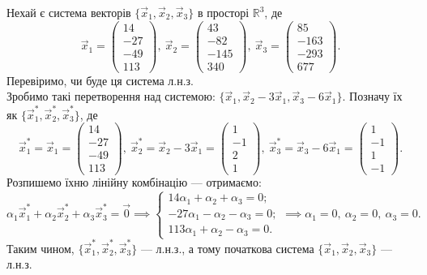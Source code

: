 \documentclass{math_library}
\begin{document}
	\begin{example}
	Нехай є система векторів $\{\vec{x}_1,\vec{x}_2,\vec{x}_3\}$ в просторі $\mathbb{R}^3$, де
	\[ 
	\vec{x}_1 = \begin{pmatrix}
	14 \\ -27 \\ -49 \\ 113
	\end{pmatrix},\ \vec{x}_2 = \begin{pmatrix}
	43 \\ -82 \\ -145 \\ 340
	\end{pmatrix},\ \vec{x}_3 = \begin{pmatrix}
	85 \\ -163 \\ -293 \\ 677
	\end{pmatrix}.
	\]
	Перевіримо, чи буде ця система л.н.з.
	\bigskip \\
	Зробимо такі перетворення над системою: $\{\vec{x}_1, \vec{x}_2 - 3 \vec{x}_1, \vec{x}_3 - 6\vec{x}_1 \}$. Позначу їх як $\{\vec{x}^*_1,\vec{x}^*_2,\vec{x}^*_3\}$, де
	\[
	\vec{x}^*_1 = \vec{x}_1 = \begin{pmatrix}
	14 \\ -27 \\ -49 \\ 113
	\end{pmatrix},\ \vec{x}^*_2 = \vec{x}_2 - 3\vec{x}_1 = \begin{pmatrix}
	1 \\ -1 \\ 2 \\ 1
	\end{pmatrix},\ \vec{x}^*_3 = \vec{x}_3 - 6\vec{x}_1 = \begin{pmatrix}
	1 \\ -1 \\ 1 \\ -1
	\end{pmatrix}.
	\]
	Розпишемо їхню лінійну комбінацію --- отримаємо:
	\[
	\alpha_1 \vec{x}^*_1 + \alpha_2 \vec{x}^*_2 + \alpha_3 \vec{x}^*_3 = \vec{0} \implies \begin{cases} 14 \alpha_1 + \alpha_2 + \alpha_3 = 0; \\
					   -27 \alpha_1 - \alpha_2 - \alpha_3 = 0; \\
					   113 \alpha_1 + \alpha_2 - \alpha_3 = 0.
	\end{cases} \implies \alpha_1 = 0,\ \alpha_2 = 0,\ \alpha_3 = 0.
	\]
	Таким чином, $\{\vec{x}^*_1, \vec{x}^*_2, \vec{x}^*_3\}$ --- л.н.з., а тому початкова система $\{\vec{x}_1,\vec{x}_2,\vec{x}_3\}$ --- л.н.з.
	\end{example}
	
\end{document}
